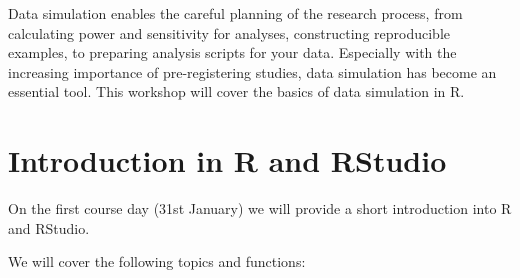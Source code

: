 \documentclass[
  letterpaper,
  DIV=11,
  numbers=noendperiod,
  oneside]{scrreprt}
\begin{document}

\hfill\break

Data simulation enables the careful planning of the research process,
from calculating power and sensitivity for analyses, constructing
reproducible examples, to preparing analysis scripts for your data.
Especially with the increasing importance of pre-registering studies,
data simulation has become an essential tool. This workshop will cover
the basics of data simulation in R.


\hypertarget{introduction-in-r-and-rstudio}{%
\chapter*{Introduction in R and
RStudio}\label{introduction-in-r-and-rstudio}}


\hfill\break

On the first course day (31st January) we will provide a short
introduction into R and RStudio.

We will cover the following topics and functions:

\hypertarget{section}{%
\subsection*{}\label{section}}
\end{document}
